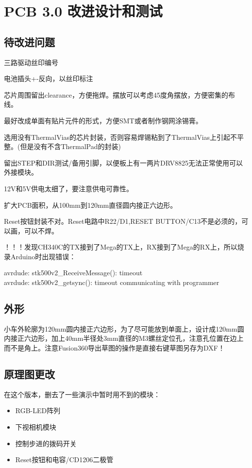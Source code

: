 \chapter{PCB 3.0 改进设计和测试}
\label{cha:PCB-v3}

\section{待改进问题}

三路驱动丝印编号

电池插头+-反向，以丝印标注

芯片周围留出clearance，方便拖焊。摆放可以考虑45度角摆放，方便密集的布线。

最好改成单面有贴片元件的形式，方便SMT或者制作钢网涂锡膏。

选用没有ThermalVias的芯片封装，否则容易焊锡粘到了ThermalVias上引起不平整。(但是没有不含ThermalPad的封装)

留出STEP和DIR测试/备用引脚，以便板上有一两片DRV8825无法正常使用可以外接模块。

12V和5V供电太细了，要注意供电可靠性。

扩大PCB面积，从100mm到120mm直径圆内接正六边形。

Reset按钮封装不对。Reset电路中R22/D1,RESET BUTTON/C13不是必须的，可以画，可以不焊。

！！！发现CH340C的TX接到了Mega的TX上，RX接到了Mega的RX上，所以烧录Arduino时出现错误：

\begin{tcolorbox}
    avrdude: stk500v2\_ReceiveMessage(): timeout \\
    avrdude: stk500v2\_getsync(): timeout communicating with programmer
\end{tcolorbox}


\section{外形}

小车外轮廓为120mm圆内接正六边形，为了尽可能放到单面上，设计成120mm圆内接正六边形，加上40mm半径处3mm直径的M3螺丝定位孔，注意孔位置在边上而不是角上。注意Fusion360导出草图的操作是直接右键草图另存为DXF！

\section{原理图更改}

在这个版本，删去了一些演示中暂时用不到的模块：

\begin{itemize}
    \item RGB-LED阵列
    \item 下视相机模块
    \item 控制步进的拨码开关
    \item Reset按钮和电容/CD1206二极管
\end{itemize}

